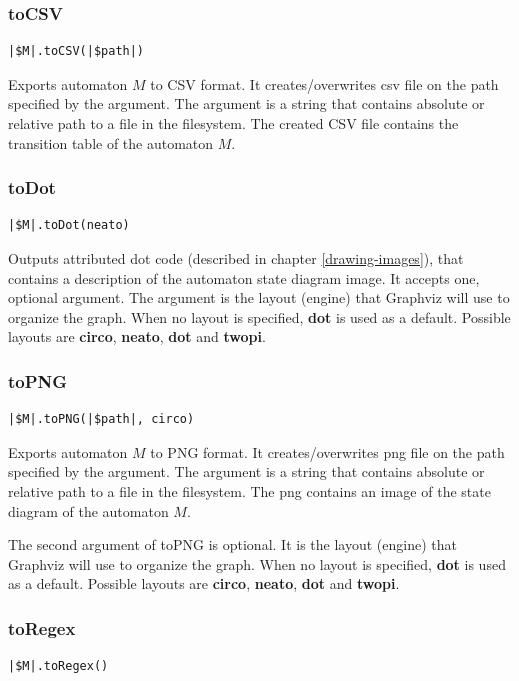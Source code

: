 \documentclass{ctuthesis}
\begin{document}
\subsubsection{toCSV}
\begin{lstlisting}[language = JASL_snippet]
	|$M|.toCSV(|$path|)
\end{lstlisting}

Exports automaton $M$ to CSV format. It creates/overwrites csv file on the path specified by the argument. The argument is a string that contains absolute or relative path to a file in the filesystem. The created CSV file contains the transition table of the automaton $M$.

\subsubsection{toDot}
\label{subsec:toDot}
\begin{lstlisting}[language = JASL_snippet]
	|$M|.toDot(neato)
\end{lstlisting}

Outputs attributed dot code (described in chapter \ref{drawing-images}), that contains a description of the automaton state diagram image. It accepts one, optional argument. The argument is the layout (engine) that Graphviz will use to organize the graph. When no layout is specified, \textbf{dot} is used as a default. Possible layouts are \textbf{circo}, \textbf{neato}, \textbf{dot} and \textbf{twopi}. 

\subsubsection{toPNG}
\begin{lstlisting}[language = JASL_snippet]
	|$M|.toPNG(|$path|, circo)
\end{lstlisting}

Exports automaton $M$ to PNG format. It creates/overwrites png file on the path specified by the argument. The argument is a string that contains absolute or relative path to a file in the filesystem. The png contains an image of the state diagram of the automaton $M$. 

The second argument of toPNG is optional. It is the layout (engine) that Graphviz will use to organize the graph. When no layout is specified, \textbf{dot} is used as a default. Possible layouts are \textbf{circo}, \textbf{neato}, \textbf{dot} and \textbf{twopi}.

\subsubsection{toRegex}
\label{toRegex}
\begin{lstlisting}[language = JASL_snippet]
	|$M|.toRegex()
\end{lstlisting}
\end{document}
